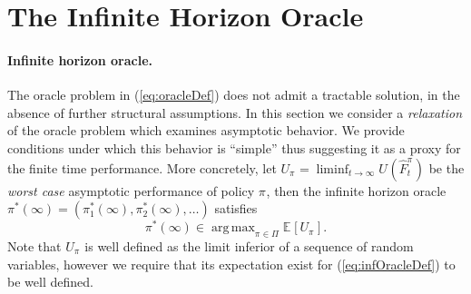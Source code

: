 \documentclass[final,12pt]{colt2018}
\newcommand{\prn}[1]{\left( #1 \right)}
\newcommand{\brk}[1]{\left\lbrack #1 \right\rbrack}
\newcommand{\EEBrk}[2][]{\mathbb{E}_{#1}\brk{#2}}
\DeclareMathOperator*{\argmax}{arg\,max}
\newcommand{\policiesSet}{\Pi}
\newcommand{\policy}[1][]{\pi^{#1}}
\newcommand{\policyAt}[2][]{\policy[#1]_{#2}}
\newcommand{\optPolicyAt}[1]{\policyAt[*]{#1}\prn{\infty}}
\newcommand{\optPolicy}{\policy[*]\prn{\infty}}
\newcommand{\RPi}[1][\policy]{{U}_{#1}}
\newcommand{\RHat}[1][]{{U}^{#1}}
\newcommand{\RHatFunc}[2][]{\RHat[{#1}] \prn{#2}}
\newcommand{\FHatPi}[2][\policy]{\hat{F}_{#2}^{#1}}
\begin{document}
	
	
	
	
	
	
	
	
	
	
	
	
	
	
	
	
	
	
	
	
	
	
	
	
	
	
	
	
	
	
	
	
	
	
	
	
	
	
	
	
	














	\section{The Infinite Horizon Oracle}
	\label{sec:infHorizonOracle}
	\paragraph{Infinite horizon oracle.} The oracle problem in (\ref{eq:oracleDef}) does not admit a tractable solution, in the absence of further structural assumptions. In this section we consider a \textit{relaxation} of the oracle problem which examines asymptotic behavior. We provide conditions under which this behavior is ``simple'' thus suggesting it as a proxy for the finite time performance. More concretely, let $\RPi = \liminf_{t \to \infty} \RHatFunc{\FHatPi{t}}$ be the \textit{worst case} asymptotic performance of policy $\policy$, then the infinite horizon oracle $\optPolicy = (\optPolicyAt{1}, \optPolicyAt{2}, \ldots)$ satisfies
	\begin{equation} \label{eq:infOracleDef}
		\optPolicy \in \argmax_{\policy \in \policiesSet} \EEBrk{\RPi}.
	\end{equation}
	Note that $\RPi$ is well defined as the limit inferior of a sequence of random variables, however we require that its expectation exist for (\ref{eq:infOracleDef}) to be well defined. 
	
\end{document}
